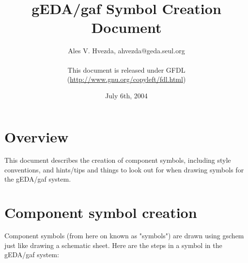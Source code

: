 \documentclass{article}
\title{gEDA/gaf Symbol Creation Document}
\author{Ales V. Hvezda, ahvezda@geda.seul.org\\
	\\
	This document is released under GFDL\\ 
	(\url{http://www.gnu.org/copyleft/fdl.html})}
\date{July 6th, 2004}
\begin{document}
\maketitle
\newpage

\tableofcontents
\newpage


\section{Overview}

This document describes the creation of component symbols, including style
conventions, and hints/tips and things to look out for when drawing symbols
for the gEDA/gaf system.

\section{Component symbol creation}

Component symbols (from here on known as "symbols") are drawn
using gschem just like drawing a schematic sheet.  Here are the steps in
a symbol in the gEDA/gaf system:
\end{document}
